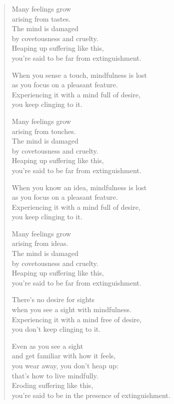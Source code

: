 \documentclass[12pt,openany]{book}%
\begin{document}
\begin{verse}
Many feelings grow \\
arising from tastes. \\
The mind is damaged \\
by covetousness and cruelty. \\
Heaping up suffering like this, \\
you’re said to be far from extinguishment. 

When you sense a touch, mindfulness is lost \\
as you focus on a pleasant feature. \\
Experiencing it with a mind full of desire, \\
you keep clinging to it. 

Many feelings grow \\
arising from touches. \\
The mind is damaged \\
by covetousness and cruelty. \\
Heaping up suffering like this, \\
you’re said to be far from extinguishment. 

When you know an idea, mindfulness is lost \\
as you focus on a pleasant feature. \\
Experiencing it with a mind full of desire, \\
you keep clinging to it. 

Many feelings grow \\
arising from ideas. \\
The mind is damaged \\
by covetousness and cruelty. \\
Heaping up suffering like this, \\
you’re said to be far from extinguishment. 

There’s no desire for sights \\
when you see a sight with mindfulness. \\
Experiencing it with a mind free of desire, \\
you don’t keep clinging to it. 

Even as you see a sight \\
and get familiar with how it feels, \\
you wear away, you don’t heap up: \\
that’s how to live mindfully. \\
Eroding suffering like this, \\
you’re said to be in the presence of extinguishment. 


\end{verse}
\end{document}
